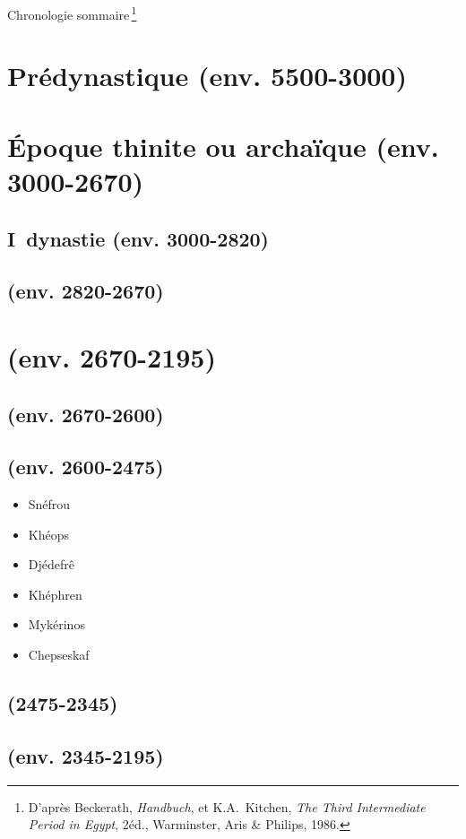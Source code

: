 Chronologie sommaire\,\footnote{D'après Beckerath, \emph{Handbuch}, 
et K.A.~Kitchen, \emph{The Third Intermediate Period in Egypt}, 
2\ieme éd., Warminster, Aris \& Philips, 1986.}

\section*{Prédynastique (env. 5500-3000)}

\section*{\'Epoque thinite ou archaïque (env. 3000-2670)}

\subsection*{I\iere~dynastie (env. 3000-2820)}
\subsection*{ (env. 2820-2670)}

\section*{\OK (env. 2670-2195)}

\subsection*{ (env. 2670-2600)}
\subsection*{ (env. 2600-2475)}
  \begin{itemize}
    \item Snéfrou
    \item Khéops
    \item Djédefrê
    \item Khéphren
    \item Mykérinos
    \item Chepseskaf
  \end{itemize}
\subsection*{ (2475-2345)}
\subsection*{ (env. 2345-2195)}

